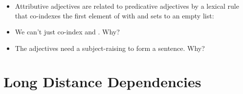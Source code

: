 \documentclass[a4paper,landscape,headrule,footrule]{foils}
\begin{document}
\begin{itemize}
 \item Attributive adjectives are related to predicative adjectives by
   a lexical rule that co-indexes the first element of  with
    and sets  to an empty list: 
     \into {}
   \\    
 \item We can't just co-index  and .  Why?
 \item The  adjectives need a
   subject-raising \eng{be} to form a sentence. Why?
 \end{itemize}


\section{Long Distance Dependencies}
\end{document}
